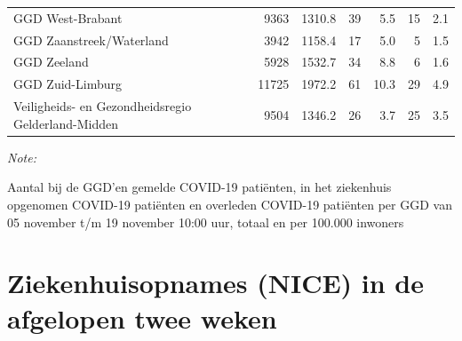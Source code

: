 \documentclass[
  english,
  man,floatsintext]{apa6}
\begin{document}
\begin{table}
\begin{threeparttable}
\begin{tabular}{lrrrrrr}
GGD West-Brabant & 9363 & 1310.8 & 39 & 5.5 & 15 & 2.1\\
GGD Zaanstreek/Waterland & 3942 & 1158.4 & 17 & 5.0 & 5 & 1.5\\
GGD Zeeland & 5928 & 1532.7 & 34 & 8.8 & 6 & 1.6\\
GGD Zuid-Limburg & 11725 & 1972.2 & 61 & 10.3 & 29 & 4.9\\
Veiligheids- en Gezondheidsregio Gelderland-Midden & 9504 & 1346.2 & 26 & 3.7 & 25 & 3.5\\
\bottomrule
\end{tabular}
\begin{tablenotes}
\item \textit{Note: } 
\item Aantal bij de GGD’en gemelde COVID-19 patiënten, in het ziekenhuis opgenomen COVID-19 patiënten en overleden COVID-19 patiënten per GGD van 05 november t/m 19 november 10:00 uur, totaal en per 100.000 inwoners
\end{tablenotes}
\end{threeparttable}
\endgroup{}
\end{table}

\newpage

\hypertarget{ziekenhuisopnames-nice-in-de-afgelopen-twee-weken}{%
\section{Ziekenhuisopnames (NICE) in de afgelopen twee weken}\label{ziekenhuisopnames-nice-in-de-afgelopen-twee-weken}}
\end{document}
